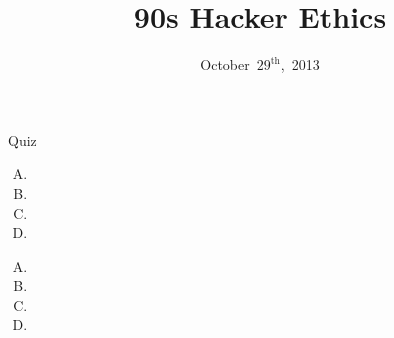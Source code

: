 \documentclass{beamer}
\title{90s Hacker Ethics}
\date{October~$29^{\text{th}}$,~2013}
\begin{document}
\begin{frame}
\titlepage
\end{frame}

\begin{frame}{Quiz}
\begin{enumerate}[(A)]
\item<1> 
\item<1> 
\item<1-2> 
\item<1> 
\end{enumerate}
\bigskip
\begin{enumerate}[(A)]
\item<1-2> 
\item<1> 
\item<1> 
\item<1> 
\end{enumerate}
\end{frame}
\end{document}
